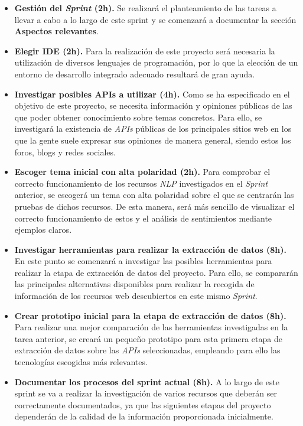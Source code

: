 \begin{itemize}

    \item \textbf{Gestión del \textit{Sprint} (2h).} Se realizará el planteamiento de las tareas a llevar a cabo a lo largo de este sprint y se comenzará a documentar la sección \textbf{Aspectos relevantes}.

    \item \textbf{Elegir IDE (2h).} Para la realización de este proyecto será necesaria la utilización de diversos lenguajes de programación, por lo que la elección de un entorno de desarrollo integrado adecuado resultará de gran ayuda.

    \item \textbf{Investigar posibles APIs a utilizar (4h).} Como se ha especificado en el objetivo de este proyecto, se necesita información y opiniones públicas de las que poder obtener conocimiento sobre temas concretos. Para ello, se investigará la existencia de \textit{APIs} públicas de los principales sitios web en los que la gente suele expresar sus opiniones de manera general, siendo estos los foros, blogs y redes sociales.

    \item \textbf{Escoger tema inicial con alta polaridad (2h).} Para comprobar el correcto funcionamiento de los recursos \textit{NLP} investigados en el \textit{Sprint} anterior, se escogerá un tema con alta polaridad sobre el que se centrarán las pruebas de dichos recursos. De esta manera, será más sencillo de visualizar el correcto funcionamiento de estos y el análisis de sentimientos mediante ejemplos claros.

    \item \textbf{Investigar herramientas para realizar la extracción de datos (8h).} En este punto se comenzará a investigar las posibles herramientas para realizar la etapa de extracción de datos del proyecto. Para ello, se compararán las principales alternativas disponibles para realizar la recogida de información de los recursos web descubiertos en este mismo \textit{Sprint}.

    \item \textbf{Crear prototipo inicial para la etapa de extracción de datos (8h).} Para realizar una mejor comparación de las herramientas investigadas en la tarea anterior, se creará un pequeño prototipo para esta primera etapa de extracción de datos sobre las \textit{APIs} seleccionadas, empleando para ello las tecnologías escogidas más relevantes.

    \item \textbf{Documentar los procesos del sprint actual (8h).} A lo largo de este sprint se va a realizar la investigación de varios recursos que deberán ser correctamente documentados, ya que las siguientes etapas del proyecto dependerán de la calidad de la información proporcionada inicialmente.

\end{itemize}








